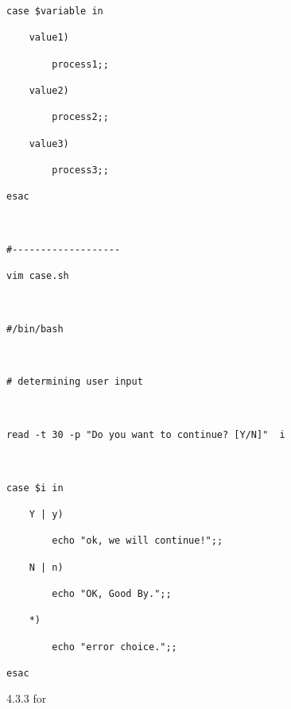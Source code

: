 \documentclass[
]{article}
\begin{document}
\begin{verbatim}
case $variable in

	value1)

		process1;;

	value2)

		process2;;

	value3)

		process3;;

esac



#-------------------

vim case.sh



#/bin/bash



# determining user input



read -t 30 -p "Do you want to continue? [Y/N]"  i



case $i in

	Y | y)

		echo "ok, we will continue!";;

	N | n)

		echo "OK, Good By.";;

	*)

		echo "error choice.";;

esac
\end{verbatim}

4.3.3 for
\end{document}
